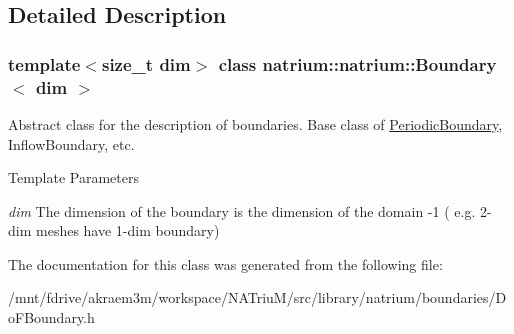 \subsection{Detailed Description}
\subsubsection*{template$<$size\_\-t dim$>$ class natrium::natrium::Boundary$<$ dim $>$}

Abstract class for the description of boundaries. Base class of \hyperlink{classnatrium_1_1PeriodicBoundary}{PeriodicBoundary}, InflowBoundary, etc. 
\begin{DoxyTemplParams}{Template Parameters}
\item[{\em dim}]The dimension of the boundary is the dimension of the domain -\/1 ( e.g. 2-\/dim meshes have 1-\/dim boundary) \end{DoxyTemplParams}


The documentation for this class was generated from the following file:\begin{DoxyCompactItemize}
\item 
/mnt/fdrive/akraem3m/workspace/NATriuM/src/library/natrium/boundaries/DoFBoundary.h\end{DoxyCompactItemize}
